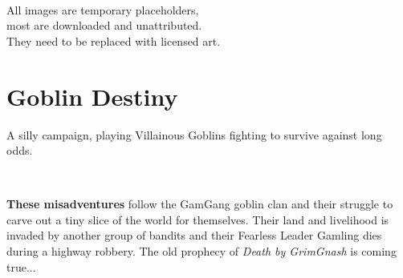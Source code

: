 \

\noindent
All images are temporary placeholders, \\
most are downloaded and unattributed.\\
They need to be replaced with licensed art.

\normalsize






\cleardoublepage
\pagestyle{fancy}
\flushbottom









\section*{Goblin Destiny}

A silly campaign, playing Villainous Goblins fighting to survive against long odds.

\

\noindent \textbf{These misadventures} follow the GamGang goblin clan and their struggle to carve out a tiny slice of the world for themselves. Their land and livelihood is invaded by another group of bandits and their Fearless Leader Gamling dies during a highway robbery. The old prophecy of \emph{Death by GrimGnash} is coming true...

\

\tableofcontents                                   %

\vspace{4\baselineskip}


